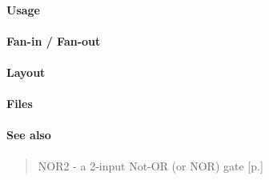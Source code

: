 \paragraph{Usage}

\paragraph{Fan-in / Fan-out}

\paragraph{Layout}

\paragraph{Files}

\paragraph{See also}
\begin{quote}
    NOR2 - a 2-input Not-OR (or NOR) gate [p.\pageref{NOR2}]
\end{quote}
